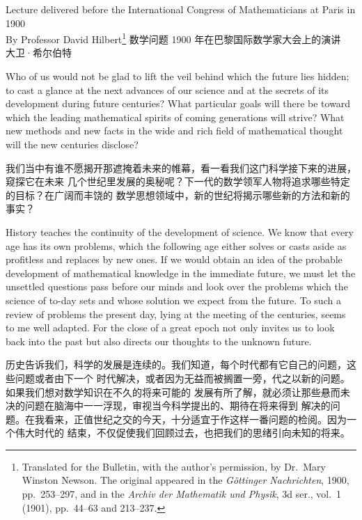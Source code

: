 \documentclass{mojing-translation}
\begin{document}
\mainmatter
\halftitle
\begin{pairs}

          {Lecture delivered before the International Congress of Mathematicians at Paris in 1900
           \\ By Professor David Hilbert\footnote{Translated for the Bulletin, with the author's
           permission, by Dr.\ Mary Winston Newson. The original appeared in the
           \textit{G\"ottinger Nachrichten}, 1900, pp.~253--297, and in the \textit{Archiv der
           Mathematik und Physik}, 3d ser., vol.~1 (1901), pp.~44--63 and 213--237.}}
          {数学问题}
          {1900 年在巴黎国际数学家大会上的演讲\\大卫·希尔伯特}

\begin{original}
Who of us would not be glad to lift the veil behind which the future lies hidden; to cast
a glance at the next advances of our science and at the secrets of its development during
future centuries? What particular goals will there be toward which the leading mathematical
spirits of coming generations will strive? What new methods and new facts in the wide and
rich field of mathematical thought will the new centuries disclose?
\end{original}
\begin{translated}
我们当中有谁不愿揭开那遮掩着未来的帷幕，看一看我们这门科学接下来的进展，窥探它在未来
几个世纪里发展的奥秘呢？下一代的数学领军人物将追求哪些特定的目标？在广阔而丰饶的
数学思想领域中，新的世纪将揭示哪些新的方法和新的事实？
\end{translated}

\begin{original}
History teaches the continuity of the development of science. We know that every age has
its own problems, which the following age either solves or casts aside as profitless and
replaces by new ones. If we would obtain an idea of the probable development of mathematical
knowledge in the immediate future, we must let the unsettled questions pass before our minds
and look over the problems which the science of to-day sets and whose solution we expect from
the future. To such a review of problems the present day, lying at the meeting of the
centuries, seems to me well adapted. For the close of a great epoch not only invites us to
look back into the past but also directs our thoughts to the unknown future.
\end{original}
\begin{translated}
历史告诉我们，科学的发展是连续的。我们知道，每个时代都有它自己的问题，这些问题或者由下一个
时代解决，或者因为无益而被搁置一旁，代之以新的问题。如果我们想对数学知识在不久的将来可能的
发展有所了解，就必须让那些悬而未决的问题在脑海中一一浮现，审视当今科学提出的、期待在将来得到
解决的问题。在我看来，正值世纪之交的今天，十分适宜于作这样一番问题的检阅。因为一个伟大时代的
结束，不仅促使我们回顾过去，也把我们的思绪引向未知的将来。
\end{translated}


\end{pairs}
\end{document}
